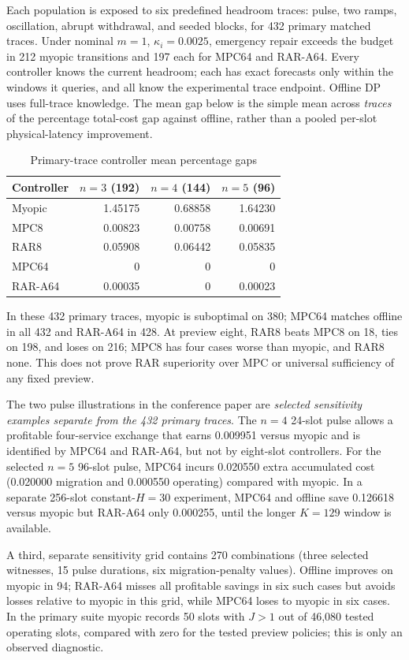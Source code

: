 \documentclass[10pt,a4paper]{article}
\begin{document}
Each population is exposed to six predefined headroom traces: pulse, two ramps, oscillation, abrupt withdrawal, and seeded blocks, for 432 primary matched traces. Under nominal $m=1$, $\kappa_i=0.0025$, emergency repair exceeds the budget in 212 myopic transitions and 197 each for MPC64 and RAR-A64. Every controller knows the current headroom; each has exact forecasts only within the windows it queries, and all know the experimental trace endpoint. Offline DP uses full-trace knowledge. The mean gap below is the simple mean across \emph{traces} of the percentage total-cost gap against offline, rather than a pooled per-slot physical-latency improvement.
\begin{table}[h]\centering\small
\caption{Primary-trace controller mean percentage gaps}\begin{tabular}{lrrr}\toprule
Controller & $n=3$ (192) & $n=4$ (144) & $n=5$ (96)\\\midrule
Myopic &1.45175&0.68858&1.64230\\
MPC8&0.00823&0.00758&0.00691\\
RAR8&0.05908&0.06442&0.05835\\
MPC64&0&0&0\\
RAR-A64&0.00035&0&0.00023\\\bottomrule
\end{tabular}\end{table}
In these 432 primary traces, myopic is suboptimal on 380; MPC64 matches offline in all 432 and RAR-A64 in 428. At preview eight, RAR8 beats MPC8 on 18, ties on 198, and loses on 216; MPC8 has four cases worse than myopic, and RAR8 none. This does not prove RAR superiority over MPC or universal sufficiency of any fixed preview.

The two pulse illustrations in the conference paper are \emph{selected sensitivity examples separate from the 432 primary traces}. The $n=4$ 24-slot pulse allows a profitable four-service exchange that earns 0.009951 versus myopic and is identified by MPC64 and RAR-A64, but not by eight-slot controllers. For the selected $n=5$ 96-slot pulse, MPC64 incurs 0.020550 extra accumulated cost (0.020000 migration and 0.000550 operating) compared with myopic. In a separate 256-slot constant-$H=30$ experiment, MPC64 and offline save 0.126618 versus myopic but RAR-A64 only 0.000255, until the longer $K=129$ window is available.

A third, separate sensitivity grid contains 270 combinations (three selected witnesses, 15 pulse durations, six migration-penalty values). Offline improves on myopic in 94; RAR-A64 misses all profitable savings in six such cases but avoids losses relative to myopic in this grid, while MPC64 loses to myopic in six cases. In the primary suite myopic records 50 slots with $J>1$ out of 46,080 tested operating slots, compared with zero for the tested preview policies; this is only an observed diagnostic.
\end{document}
